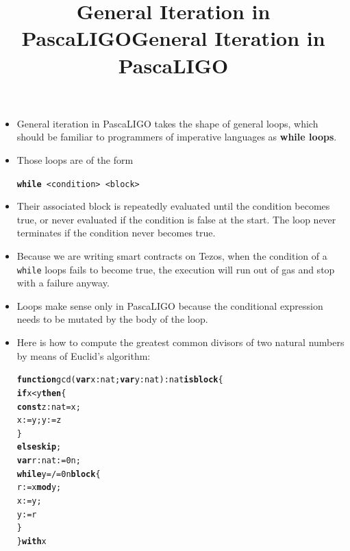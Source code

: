 \documentclass[wide]{slides}
\newcommand{\Kblock}[0]{\textbf{block}\xspace}
\newcommand{\Kconst}[0]{\textbf{const}\xspace}
\newcommand{\Kelse}[0]{\textbf{else}\xspace}
\newcommand{\Kfunction}[0]{\textbf{function}\xspace}
\newcommand{\Kif}[0]{\textbf{if}\xspace}
\newcommand{\Kis}[0]{\textbf{is}\xspace}
\newcommand{\Kmod}[0]{\textbf{mod}\xspace}
\newcommand{\Kskip}[0]{\textbf{skip}\xspace}
\newcommand{\Kthen}[0]{\textbf{then}\xspace}
\newcommand{\Kvar}[0]{\textbf{var}\xspace}
\newcommand{\Kwhile}[0]{\textbf{while}\xspace}
\newcommand{\Kwith}[0]{\textbf{with}\xspace}
\begin{document}
\begin{slide}
  \title{General Iteration in PascaLIGO}

  \begin{itemize}

    \item General iteration in PascaLIGO takes the shape of general
      loops, which should be familiar to programmers of imperative
      languages as \textbf{while loops}.

    \item Those loops are of the form
      \begin{center}
        \texttt{\textbf{while} <condition> <block>}
      \end{center}

    \item Their associated block is repeatedly evaluated until the
      condition becomes true, or never evaluated if the condition is
      false at the start. The loop never terminates if the condition
      never becomes true.

    \item Because we are writing smart contracts on Tezos, when the
      condition of a \texttt{while} loops fails to become true, the
      execution will run out of gas and stop with a failure anyway.

    \item Loops make sense only in PascaLIGO because the conditional
      expression needs to be mutated by the body of the loop.

  \end{itemize}

\end{slide}

\begin{slide}
  \title{General Iteration in PascaLIGO}

  \begin{itemize}

    \item Here is how to compute the greatest common divisors of two
      natural numbers by means of Euclid's algorithm:
      \begin{alltt}
\Kfunction gcd (\Kvar x : nat; \Kvar y : nat) : nat \Kis \Kblock \{
  \Kif x < y \Kthen \{
    \Kconst z : nat = x;
    x := y; y := z
  \}
  \Kelse \Kskip;
  \Kvar r : nat := 0n;
  \Kwhile y =/= 0n \Kblock \{
    r := x \Kmod y;
    x := y;
    y := r
  \}
\} \Kwith x
      \end{alltt}

  \end{itemize}

\end{slide}
\end{document}
